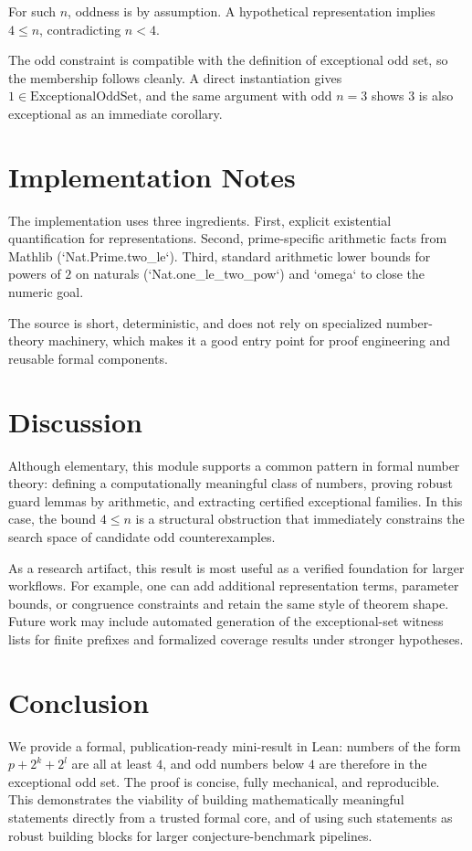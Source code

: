 \documentclass[11pt]{article}
\begin{document}
For such $n$, oddness is by assumption. A hypothetical representation implies
$4\le n$, contradicting $n<4$.

The odd constraint is compatible with the definition of exceptional odd set, so the
membership follows cleanly. A direct instantiation gives $1\in\text{ExceptionalOddSet}$,
and the same argument with odd $n=3$ shows $3$ is also exceptional as an immediate
corollary.

\section{Implementation Notes}
The implementation uses three ingredients. First, explicit existential
quantification for representations. Second, prime-specific arithmetic facts from
Mathlib (`Nat.Prime.two_le`). Third, standard arithmetic lower bounds for powers of
$2$ on naturals (`Nat.one_le_two_pow`) and `omega` to close the numeric goal.

The source is short, deterministic, and does not rely on specialized number-theory
machinery, which makes it a good entry point for proof engineering and reusable
formal components.

\section{Discussion}
Although elementary, this module supports a common pattern in formal number theory:
defining a computationally meaningful class of numbers, proving robust guard
lemmas by arithmetic, and extracting certified exceptional families. In this case,
the bound $4\le n$ is a structural obstruction that immediately constrains the
search space of candidate odd counterexamples.

As a research artifact, this result is most useful as a verified foundation for
larger workflows. For example, one can add additional representation terms,
parameter bounds, or congruence constraints and retain the same style of theorem
shape. Future work may include automated generation of the exceptional-set witness
lists for finite prefixes and formalized coverage results under stronger hypotheses.

\section{Conclusion}
We provide a formal, publication-ready mini-result in Lean: numbers of the
form $p+2^k+2^l$ are all at least $4$, and odd numbers below $4$ are therefore
in the exceptional odd set. The proof is concise, fully mechanical, and reproducible.
This demonstrates the viability of building mathematically meaningful statements
directly from a trusted formal core, and of using such statements as robust
building blocks for larger conjecture-benchmark pipelines.
\end{document}
